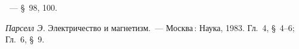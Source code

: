 \begin{lab:literature}

\item \SivuhinIII~--- \S~98, 100.

\item \emph{Парселл Э.} Электричество и магнетизм.~--- Москва\,: Наука, 1983. 
Гл.~4, \S~4--6; Гл.~6, \S~9.

\end{lab:literature}
